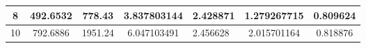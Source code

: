 \begin{table}
{\begin{tabular}{|c|c|c|c|l|c|c|}
8                                                                                          & 492.6532                                                                                                                                                                                                                       & 778.43                                                                                                                                                                                                                       & 3.837803144                                                                                                                     & 2.428871                                                                                                                                              & 1.279267715                                                                                & 0.809624                                                                                   \\ \hline
10                                                                                         & 792.6886                                                                                                                                                                                                                       & 1951.24                                                                                                                                                                                                                      & 6.047103491                                                                                                                     & 2.456628                                                                                                                                              & 2.015701164                                                                                & 0.818876                                                                                   \\ \hline
\end{tabular}}
\end{table}

